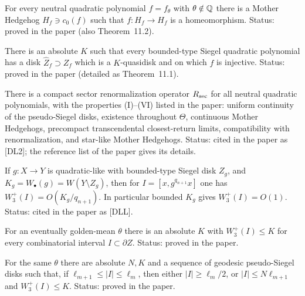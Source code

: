\begin{theorem}
\label{thm:neutral-1-2}
For every neutral quadratic polynomial $f=f_\theta$ with $\theta\notin\mathbb Q$ there is a Mother
Hedgehog $H_f\ni c_0(f)$ such that $f\colon H_f\to H_f$ is a homeomorphism.  Status: proved in the
paper (also Theorem~11.2).
\end{theorem}

\begin{theorem}
\label{thm:neutral-1-3}
There is an absolute $K$ such that every bounded-type Siegel quadratic polynomial has a disk
$\widehat Z_f\supset Z_f$ which is a $K$-quasidisk and on which $f$ is injective.  Status: proved in
the paper (detailed as Theorem~11.1).
\end{theorem}

\begin{theorem}
\label{thm:neutral-1-5}
There is a compact sector renormalization operator $R_{\rm sec}$ for all neutral quadratic polynomials,
with the properties (I)--(VI) listed in the paper: uniform continuity of the pseudo-Siegel disks,
existence throughout $\Theta$, continuous Mother Hedgehogs, precompact transcendental closest-return
limits, compatibility with renormalization, and star-like Mother Hedgehogs.  Status: cited in the
paper as {[DL2]}; the reference list of the paper gives its details.
\end{theorem}

\begin{theorem}
\label{thm:neutral-1-6}
If $g\colon X\to Y$ is quadratic-like with bounded-type Siegel disk $Z_g$, and $K_g=W_\bullet(g)=W(Y\setminus Z_g)$,
then for $I=[x,g^{q_{n+1}}x]$ one has $W^+_3(I)=O(K_g/q_{n+1})$.  In particular bounded $K_g$ gives
$W^+_3(I)=O(1)$.  Status: cited in the paper as {[DLL]}.
\end{theorem}

\begin{theorem}
\label{thm:neutral-10-1}
For an eventually golden-mean $\theta$ there is an absolute $K$ with $W^+_3(I)\le K$ for every combinatorial
interval $I\subset\partial Z$.  Status: proved in the paper.
\end{theorem}

\begin{theorem}
\label{thm:neutral-10-2}
For the same $\theta$ there are absolute $N,K$ and a sequence of geodesic pseudo-Siegel disks such that, if
$\ell_{m+1}\le|I|\le\ell_m$, then either $|I|\ge\ell_m/2$, or $|I|\le N\ell_{m+1}$ and $W^+_3(I)\le K$.
Status: proved in the paper.
\end{theorem}

